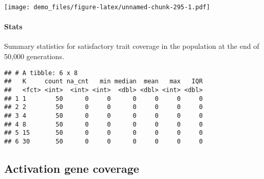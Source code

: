 \documentclass[]{book}
\newenvironment{Shaded}{\begin{snugshade}}{\end{snugshade}}
\newcommand{\DataTypeTok}[1]{\textcolor[rgb]{0.13,0.29,0.53}{#1}}
\newcommand{\KeywordTok}[1]{\textcolor[rgb]{0.13,0.29,0.53}{\textbf{#1}}}
\newcommand{\NormalTok}[1]{#1}
\newcommand{\OperatorTok}[1]{\textcolor[rgb]{0.81,0.36,0.00}{\textbf{#1}}}
\newcommand{\OtherTok}[1]{\textcolor[rgb]{0.56,0.35,0.01}{#1}}
\newcommand{\StringTok}[1]{\textcolor[rgb]{0.31,0.60,0.02}{#1}}
\let\oldparagraph\paragraph
\renewcommand{\paragraph}[1]{\oldparagraph{#1}\mbox{}}
\begin{document}
\texttt{[image: demo\_files/figure-latex/unnamed-chunk-295-1.pdf]}

\hypertarget{stats-56}{%
\paragraph{Stats}\label{stats-56}}

Summary statistics for satisfactory trait coverage in the population at the end of 50,000 generations.

\begin{Shaded}
\end{Shaded}

\begin{verbatim}
## # A tibble: 6 x 8
##   K     count na_cnt   min median  mean   max   IQR
##   <fct> <int>  <int> <int>  <dbl> <dbl> <int> <dbl>
## 1 1        50      0     0      0     0     0     0
## 2 2        50      0     0      0     0     0     0
## 3 4        50      0     0      0     0     0     0
## 4 8        50      0     0      0     0     0     0
## 5 15       50      0     0      0     0     0     0
## 6 30       50      0     0      0     0     0     0
\end{verbatim}

\hypertarget{activation-gene-coverage-12}{%
\subsection{Activation gene coverage}\label{activation-gene-coverage-12}}
\end{document}
